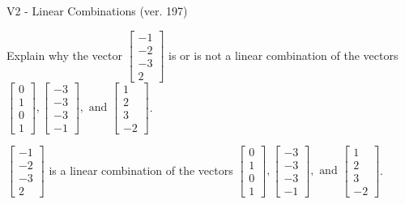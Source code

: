 \begin{exercise}
  \begin{exerciseTitle}V2 - Linear Combinations (ver. 197)\end{exerciseTitle}
  \begin{exerciseStatement}
    Explain why the vector \(\left[\begin{array}{c}
-1 \\
-2 \\
-3 \\
2
\end{array}\right]\)  is or is not a linear 
	combination of the vectors \(\left[\begin{array}{c}
0 \\
1 \\
0 \\
1
\end{array}\right] , \left[\begin{array}{c}
-3 \\
-3 \\
-3 \\
-1
\end{array}\right] , \text{ and } \left[\begin{array}{c}
1 \\
2 \\
3 \\
-2
\end{array}\right]\).
	


  \end{exerciseStatement}
  \begin{exerciseAnswer}
   \(\left[\begin{array}{c}
-1 \\
-2 \\
-3 \\
2
\end{array}\right]\) 
  	 is  
	a linear combination of the vectors \(\left[\begin{array}{c}
0 \\
1 \\
0 \\
1
\end{array}\right] , \left[\begin{array}{c}
-3 \\
-3 \\
-3 \\
-1
\end{array}\right] , \text{ and } \left[\begin{array}{c}
1 \\
2 \\
3 \\
-2
\end{array}\right]\).

	
  


  \end{exerciseAnswer}
\end{exercise}